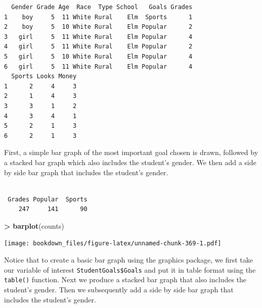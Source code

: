 \documentclass[]{krantz}
\makeatletter
\newenvironment{Shaded}{\begin{snugshade}}{\end{snugshade}}
\newcommand{\KeywordTok}[1]{\textcolor[rgb]{0.27,0.27,0.27}{\textbf{#1}}}
\newcommand{\StringTok}[1]{\textcolor[rgb]{0.5,0.5,0.5}{#1}}
\newcommand{\OperatorTok}[1]{\textcolor[rgb]{0.43,0.43,0.43}{\textbf{#1}}}
\newcommand{\NormalTok}[1]{#1}
\newenvironment{kframe}{%
\medskip{}
\setlength{\fboxsep}{.8em}
 \def\at@end@of@kframe{}%
 \ifinner\ifhmode%
  \def\at@end@of@kframe{\end{minipage}}%
  \begin{minipage}{\columnwidth}%
 \fi\fi%
 \def\FrameCommand##1{\hskip\@totalleftmargin \hskip-\fboxsep
 \colorbox{shadecolor}{##1}\hskip-\fboxsep
     \hskip-\linewidth \hskip-\@totalleftmargin \hskip\columnwidth}%
 \MakeFramed {\advance\hsize-\width
   \@totalleftmargin\z@ \linewidth\hsize
   \@setminipage}}%
 {\par\unskip\endMakeFramed%
 \at@end@of@kframe}
\renewenvironment{Shaded}{\begin{kframe}}{\end{kframe}}
\makeatother
\begin{document}
\begin{verbatim}
  Gender Grade Age  Race  Type School   Goals Grades
1    boy     5  11 White Rural    Elm  Sports      1
2    boy     5  10 White Rural    Elm Popular      2
3   girl     5  11 White Rural    Elm Popular      4
4   girl     5  11 White Rural    Elm Popular      2
5   girl     5  10 White Rural    Elm Popular      4
6   girl     5  11 White Rural    Elm Popular      4
  Sports Looks Money
1      2     4     3
2      1     4     3
3      3     1     2
4      3     4     1
5      2     1     3
6      2     1     3
\end{verbatim}

First, a simple bar graph of the most important goal chosen is drawn,
followed by a stacked bar graph which also includes the student's
gender. We then add a side by side bar graph that includes the student's
gender.

\begin{Shaded}
\end{Shaded}

\begin{verbatim}

 Grades Popular  Sports 
    247     141      90 
\end{verbatim}

\begin{Shaded}
\begin{Highlighting}[]
\OperatorTok{>}\StringTok{ }\KeywordTok{barplot}\NormalTok{(counts)}
\end{Highlighting}
\end{Shaded}

\texttt{[image: bookdown\_files/figure-latex/unnamed-chunk-369-1.pdf]}

Notice that to create a basic bar graph using the graphics package, we
first take our variable of interest \texttt{StudentGoals\$Goals} and put
it in table format using the \texttt{table()} function. Next we produce
a stacked bar graph that also includes the student's gender. Then we
subsequently add a side by side bar graph that includes the student's
gender.
\end{document}
